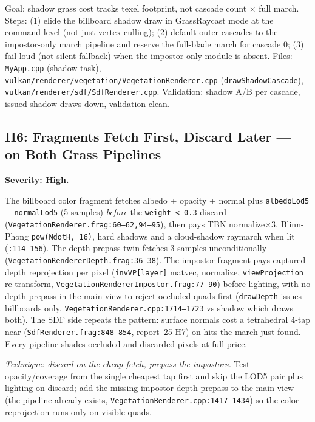\documentclass[11pt,a4paper]{article}
\begin{document}
\begin{tcolorbox}[promptbox={Prompt --- H5: one grass shadow per cascade, impostor-grade outside}]
Goal: shadow grass cost tracks texel footprint, not cascade count $\times$
full march. Steps: (1) elide the billboard shadow draw in GrassRaycast mode
at the command level (not just vertex culling); (2) default outer cascades
to the impostor-only march pipeline and reserve the full-blade march for
cascade 0; (3) fail loud (not silent fallback) when the impostor-only module
is absent. Files: \texttt{MyApp.cpp} (shadow task),
\texttt{vulkan/renderer/vegetation/VegetationRenderer.cpp}
(\texttt{drawShadowCascade}),
\texttt{vulkan/renderer/sdf/SdfRenderer.cpp}. Validation: shadow A/B per
cascade, issued shadow draws down, validation-clean.
\end{tcolorbox}

\subsection{H6: Fragments Fetch First, Discard Later --- on Both Grass Pipelines}

\textbf{Severity: High.}

The billboard color fragment fetches albedo + opacity + normal plus
\texttt{albedoLod5} + \texttt{normalLod5} (5 samples) \emph{before} the
\texttt{weight < 0.3} discard (\texttt{VegetationRenderer.frag:60--62,94--95}),
then pays TBN normalize$\times$3, Blinn-Phong \texttt{pow(NdotH, 16)}, hard
shadows and a cloud-shadow raymarch when lit (\texttt{:114--156}). The depth
prepass twin fetches 3 samples unconditionally
(\texttt{VegetationRendererDepth.frag:36--38}). The impostor fragment pays
captured-depth reprojection per pixel (\texttt{invVP[layer]} matvec,
normalize, \texttt{viewProjection} re-transform,
\texttt{VegetationRendererImpostor.frag:77--90}) before lighting, with no
depth prepass in the main view to reject occluded quads first
(\texttt{drawDepth} issues billboards only,
\texttt{VegetationRenderer.cpp:1714--1723} vs shadow which draws both).
The SDF side repeats the pattern: surface normals cost a tetrahedral 4-tap
near (\texttt{SdfRenderer.frag:848--854}, report~25 H7) on hits the march
just found. Every pipeline shades occluded and discarded pixels at full
price.

\textit{Technique: discard on the cheap fetch, prepass the impostors.}
Test opacity/coverage from the single cheapest tap first and skip the LOD5
pair plus lighting on discard; add the missing impostor depth prepass to the
main view (the pipeline already exists,
\texttt{VegetationRenderer.cpp:1417--1434}) so the color reprojection runs
only on visible quads.
\end{document}
